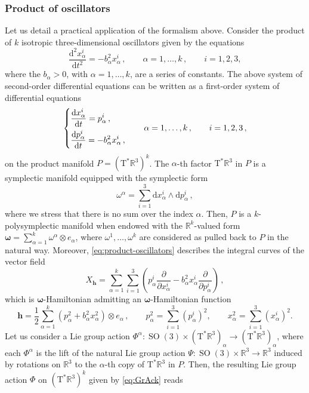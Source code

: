 \documentclass[11pt]{article}
\theoremstyle{plain}
\theoremstyle{definition}
\newcommand{\R}{\mathbb{R}}
\newcommand{\cT}{\mathrm{T}^\ast}
\newcommand{\bomega}{{\boldsymbol{\omega}}}
\renewcommand{\d}{\mathrm{d}}
\newcommand{\parder}[2]{\frac{\partial #1}{\partial #2}}
\def\d{\mathrm{d}}
\DeclareMathOperator{\SO}{SO}
\numberwithin{equation}{section}
\begin{document}
\subsubsection{Product of oscillators}

Let us detail a practical application of the formalism above. Consider the product of $k$ isotropic three-dimensional oscillators given by the equations
$$ \frac{\d ^2x^i_\alpha}{\d t^2} = -b_\alpha^2x^i_\alpha\,,\qquad \alpha = 1,\dotsc,k\,, \qquad i=1,2,3,$$
where the $b_\alpha>0$, with $\alpha=1,\ldots,k$, are a series of constants. The above system of second-order differential equations can be written as a first-order  system of differential equations
\begin{equation}\label{eq:product-oscillators}
    \begin{dcases}
        \frac{\d x^i_\alpha}{\d t} = p^i_\alpha\,,\\
        \frac{\d p^i_\alpha}{\d t} = -b_\alpha^2 x^i_\alpha\,,
    \end{dcases} \qquad \alpha = 1,\dotsc,k\,,\qquad i=1,2,3\,,
\end{equation}
on the product manifold $P = (\cT\R^3)^k$. The $\alpha$-th factor $\cT\R^3$ in $P$ is a symplectic manifold equipped with the symplectic form
\[
 \omega^\alpha = \sum_{i=1}^3\d x^i_\alpha\wedge\d p^i_\alpha\,,
\]
where we stress that there is no sum over the index $\alpha$.
Then, $P$ is a $k$-polysymplectic manifold when endowed with the $\R^k$-valued form $\bomega = \sum_{\alpha=1}^k\omega^\alpha\otimes e_\alpha$, where $\omega^1,\ldots,\omega^k$ are considered as pulled back to $P$ in the natural way. Moreover, \eqref{eq:product-oscillators} describes the integral curves of the vector field
$$ 
X_{\bm h} = \sum_{\alpha = 1}^k\sum_{i=1}^3 \left( p_\alpha^i\parder{}{x^i_\alpha} - b_\alpha^2 x_\alpha^i\parder{}{p_\alpha^i} \right)\,, 
$$
which is $\bomega$-Hamiltonian admitting an $\bomega$-Hamiltonian function
\begin{equation}\label{eq:kHamFun}
{\bm h}= \frac{1}{2}\sum_{\alpha=1}^k\left( p_\alpha^2 + b_\alpha^2x_\alpha^2 \right)\otimes e_\alpha\,,\qquad p_\alpha^2=\sum_{i=1}^3(p_\alpha^i)^2,\qquad x_\alpha^2=\sum_{i=1}^3(x_\alpha^i)^2.
\end{equation}
Let us consider a Lie group action $\Phi^\alpha: \SO(3)\times (\cT\R^3)_\alpha\rightarrow (\cT\R^3)_\alpha$, where each $\Phi^\alpha$ is the lift of the natural Lie group action $\Psi:\SO(3)\times \R^3\rightarrow \R^3$ induced by rotations on $\mathbb{R}^3$ to the $\alpha$-th copy of $\cT\R^3$ in $P$. Then, the resulting Lie group action $\Phi$ on $(\cT\R^3)^k$ given by \eqref{eq:GrAck} reads
\end{document}
